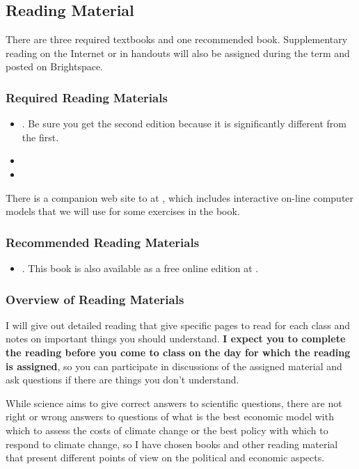 \documentclass[11pt,twoside]{jgsyllabus}\usepackage[]{graphicx}\usepackage[]{color}
\begin{document}
\subsection{Reading Material}
There are three required textbooks and one recommended book.
Supplementary reading on the Internet or in handouts will also be assigned during the term and posted on Brightspace.


\subsubsection[Required Reading]{Required Reading Materials}
\begin{itemize}
	\item \LongArcher. Be sure you get the second edition because it is significantly different from the first.
	\item \LongNordhaus
	\item \LongPielke
\end{itemize}
There is a companion web site to \emph{\Archer\/} at \ArcherURL, which includes
interactive on-line computer models that we will use for some exercises in the
book.

\subsubsection[Recommended Reading]{Recommended Reading Materials}
\begin{itemize}
  \item \LongWickham. This book is also available as a free online edition at \WickhamURL.
\end{itemize}

\subsubsection{Overview of Reading Materials}
I will give out detailed reading that give specific pages to read for each class and notes
on important things you should understand.
\textbf{I expect you to complete the reading before you come to class on the day for which
the reading is assigned}, so you can participate in discussions of the assigned material
and ask questions if there are things you don't understand.

While science aims to give correct answers to scientific questions, there are
not right or wrong answers to questions of what is the best economic model with
which to assess the costs of climate change or the best policy with which
to respond to climate change, so I have chosen books and other reading material
that present different points of view on the political and economic aspects.
\iffalse
\end{document}
